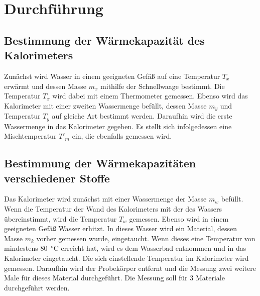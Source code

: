\section{Durchführung}
\subsection{Bestimmung der Wärmekapazität des Kalorimeters}
Zunächst wird Wasser in einem geeigneten Gefäß auf eine Temperatur $T_x$ erwärmt und dessen Masse $m_x$ mithilfe
der Schnellwaage bestimmt. Die Temperatur $T_x$ wird dabei mit einem Thermometer gemessen.
Ebenso wird das Kalorimeter mit einer zweiten Wassermenge befüllt, dessen Masse $m_y$ und
Temperatur $T_y$ auf gleiche Art bestimmt werden.
Daraufhin wird die erste Wassermenge in das Kalorimeter gegeben.
Es stellt sich infolgedessen eine Mischtemperatur $T'_m$ ein, die ebenfalls gemessen wird.

\subsection{Bestimmung der Wärmekapazitäten verschiedener Stoffe}
Das Kalorimeter wird zunächst mit einer Wassermenge der Masse $m_w$ befüllt.
Wenn die Temperatur der Wand des Kalorimeters mit der des Wassers übereinstimmt, wird die Temperatur $T_w$ gemessen.
Ebenso wird in einem geeigneten Gefäß Wasser erhitzt.
In dieses Wasser wird ein Material, dessen Masse $m_k$ vorher gemessen wurde, eingetaucht.
Wenn dieses eine Temperatur von mindestens \SI{80}{\celsius} erreicht hat, wird es dem Wasserbad entnommen
und in das Kalorimeter eingetaucht.
Die sich einstellende Temperatur im Kalorimeter wird gemessen.
Daraufhin wird der Probekörper entfernt und die Messung zwei weitere Male für dieses Material durchgeführt.
Die Messung soll für 3 Materiale durchgeführt werden.
